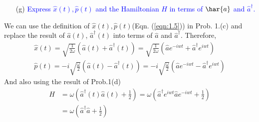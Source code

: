 \documentclass[11pt, a4paper]{article}
\begin{document}
\begin{enumerate}
    \item [(g)] \textcolor{blue}{
    Express $\hat{x}(t), \hat{p}(t)$ and the Hamiltonian $H$ in terms of $\har{a}$ and $\hat{a}^\dagger$.
    }
\end{enumerate}
We can use the definition of $\hat{x}(t), \hat{p}(t)$(Eqn. (\ref{eqn:1.5})) in Prob. 1.(c) and replace the result of $\hat{a}(t)$, $\hat{a}^{\dagger}(t)$ into terms of $\hat{a}$ and $\hat{a}^\dagger$.
Therefore,
\begin{align}
    \hat{x}(t) = \sqrt{\frac{1}{2\omega}}\left( \hat{a}(t) + \hat{a}^\dagger(t) \right) = \sqrt{\frac{1}{2\omega}}\left( \hat{a}e^{-iwt} + \hat{a}^\dagger e^{iwt} \right) \\
    \hat{p}(t) = -i\sqrt{\frac{\omega}{2}}\left( \hat{a}(t) - \hat{a}^\dagger(t) \right) = -i\sqrt{\frac{\omega}{2}}\left( \hat{a}e^{-iwt} - \hat{a}^\dagger e^{iwt} \right)
\end{align}
And also using the result of Prob.1(d)
\begin{align}
    H & = \omega \left( \hat{a}^\dagger(t)\hat{a}(t) + \frac{1}{2} \right) = \omega \left( \hat{a}^\dagger e^{iwt} \hat{a} e^{-iwt} + \frac{1}{2} \right) \\
    & = \omega \left( \hat{a}^\dagger\hat{a} + \frac{1}{2} \right)
\end{align}

\newpage
\end{document}
